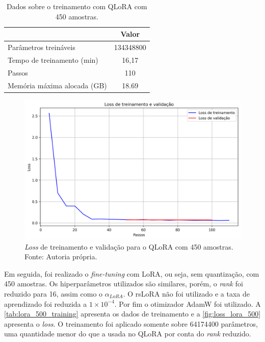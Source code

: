 \clearpage

\begin{table}[ht]
    \caption{\small Dados sobre o treinamento com \ac{QLoRA} com 450 amostras.}
    \centering
    \begin{tabular}{l|c}
        \hline
                                    & Valor     \\ \hline
        Parâmetros treináveis       & 134348800 \\
        Tempo de treinamento (min)  & 16,17     \\
        Passos                      & 110       \\
        Memória máxima alocada (GB) & 18.69     \\ \hline
    \end{tabular}
    \label{tab:qlora_500_training}
\end{table}

\begin{figure}[ht]
    \centering
    \includegraphics[width=0.8\columnwidth,keepaspectratio]{images/loss_qlora_500.png}
    \caption{\small \textit{Loss} de treinamento e validação para o \ac{QLoRA} com 450 amostras. Fonte: Autoria própria.}
    \label{fig:loss_qlora_500}
\end{figure}

Em seguida, foi realizado o \textit{fine-tuning} com \ac{LoRA}, ou seja, sem quantização, com 450 amostras. Os hiperparâmetros utilizados são similares, porém, o
\textit{rank} foi reduzido para 16, assim como o \begin{math}\alpha_{LoRA}\end{math}. O \ac{rsLoRA} não foi utilizado e a taxa de aprendizado foi reduzida a
\begin{math}1 \times 10^{-4}\end{math}. Por fim o otimizador \ac{AdamW} foi utilizado. A \autoref{tab:lora_500_training} apresenta os dados de treinamento e a
\autoref{fig:loss_lora_500} apresenta o \textit{loss}. O treinamento foi aplicado somente sobre 64174400 parâmetros, uma quantidade menor do que a usada no
\ac{QLoRA} por conta do \textit{rank} reduzido.

